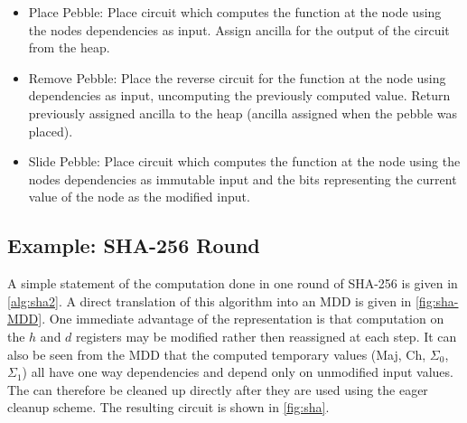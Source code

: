 \begin{itemize}

    \item Place Pebble: Place circuit which computes the function at the node
	    using the nodes dependencies as input. Assign ancilla for the
	    output of the circuit from the heap.

    \item Remove Pebble: Place the reverse circuit for the function at the node
	    using dependencies as input, uncomputing the previously computed
	    value.  Return previously assigned ancilla to the heap (ancilla
	    assigned when the pebble was placed).

    \item Slide Pebble: Place circuit which computes the function at the node
	    using the nodes dependencies as immutable input and the bits representing the
	    current value of the node as the modified input.

\end{itemize}


\subsection{Example: SHA-256 Round}

A simple statement of the computation done in one round of SHA-256 is given in
\cref{alg:sha2}. A direct translation of this algorithm into an MDD is given in
\cref{fig:sha-MDD}.  One immediate advantage of the representation is that
computation on the $h$ and $d$ registers may be modified rather then reassigned
at each step. It can also be seen from the MDD that the computed temporary values
(Maj, Ch, $\Sigma_0$,$\Sigma_1$) all have one way dependencies and depend only
on unmodified input values. The can therefore be cleaned up directly after they
are used using the eager cleanup scheme. The resulting circuit is shown in
\cref{fig:sha}.

